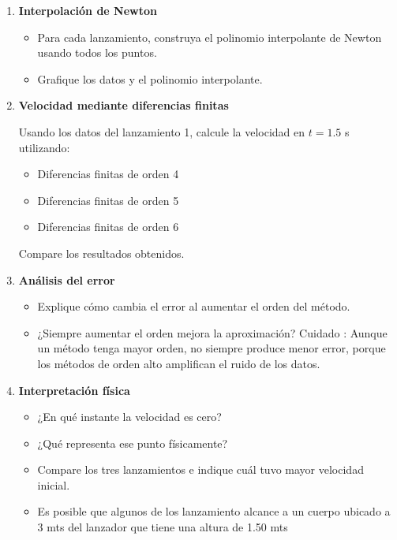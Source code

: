 \documentclass[12pt]{article}
\begin{document}
\begin{enumerate}
\item \textbf{Interpolación de Newton}
\begin{itemize}
\item Para cada lanzamiento, construya el polinomio interpolante de Newton usando todos los puntos.
\item Grafique los datos y el polinomio interpolante.
\end{itemize}

\item \textbf{Velocidad mediante diferencias finitas}

Usando los datos del lanzamiento 1, calcule la velocidad en $t = 1.5$ s utilizando:

\begin{itemize}
\item Diferencias finitas de orden 4
\item Diferencias finitas de orden 5
\item Diferencias finitas de orden 6
\end{itemize}

Compare los resultados obtenidos.

\item \textbf{Análisis del error}
\begin{itemize}
\item Explique cómo cambia el error al aumentar el orden del método.
\item ¿Siempre aumentar el orden mejora la aproximación? Cuidado : Aunque un método tenga mayor orden, no siempre produce menor error, porque los métodos de orden alto amplifican el ruido de los datos.
\end{itemize}

\item \textbf{Interpretación física}
\begin{itemize}
\item ¿En qué instante la velocidad es cero?
\item ¿Qué representa ese punto físicamente?
\item Compare los tres lanzamientos e indique cuál tuvo mayor velocidad inicial.
\item Es posible que algunos de los lanzamiento alcance a un cuerpo ubicado a 3 mts del lanzador que tiene una altura de 1.50 mts
\end{itemize}
\end{enumerate}
\end{document}
